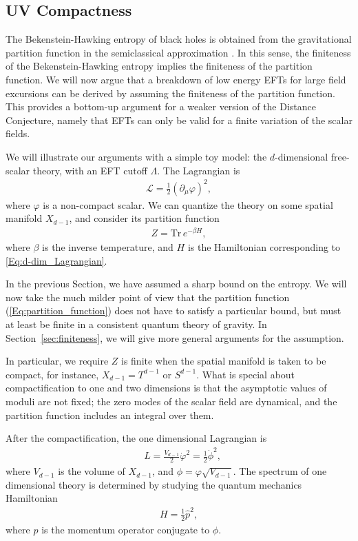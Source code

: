 \documentclass[11pt]{article}
\numberwithin{equation}{section}
\newcommand{\eq}[1]{(\ref{#1})}
\numberwithin{equation}{section}
\theoremstyle{remark}
\begin{document}
\subsection{UV Compactness\label{sec:compact}}

The Bekenstein-Hawking entropy of black holes is obtained from the gravitational partition function in the semiclassical approximation \cite{Gibbons:1976ue}. In this sense, the finiteness of the Bekenstein-Hawking entropy implies the finiteness of the partition function.
We will now argue that a breakdown of low energy EFTs for large field excursions can be derived by assuming the finiteness of the partition function.
This provides a bottom-up argument for a weaker version of the Distance Conjecture, namely that EFTs can only be valid for a finite variation of the scalar fields.

We will illustrate our arguments with a simple toy model: the $d$-dimensional free-scalar theory,  with an EFT cutoff $\Lambda$.
The Lagrangian is 
\begin{align}
\mathcal{L} = \frac{1}{2}\left(\partial_\mu\varphi\right)^2,
\label{Eq:d-dim_Lagrangian}\end{align}
where $\varphi$ is a non-compact scalar.
We can quantize the theory on some spatial manifold $X_{d-1}$, and consider its partition function
\begin{align}
Z=\mathrm{Tr} \,e^{-\beta H},
\label{Eq:partition_function}\end{align}
where $\beta$ is the inverse temperature, and $H$ is the Hamiltonian corresponding to \eqref{Eq:d-dim_Lagrangian}. 

In the previous Section, we have assumed a sharp bound on the entropy.  We will now take the much milder point of view that the partition function \eq{Eq:partition_function} does not have to satisfy a particular bound, but must at least be finite in a consistent quantum theory of gravity.  
In Section~\ref{sec:finiteness}, we will give more general arguments for the assumption.

In particular, we require $Z$ is finite when the spatial manifold is taken to be compact, for instance, $X_{d-1}=T^{d-1}$ or $S^{d-1}$.
What is special about compactification to one and two dimensions is that the asymptotic values of moduli are not fixed; the zero modes of the scalar field are dynamical, and the partition function includes an integral over them.

After the compactification, the one dimensional Lagrangian is
\begin{align}
&L = \frac{V_{d-1}}{2}\dot{\varphi}^2= \frac{1}{2}\dot{\phi}^2,
\end{align}
where $V_{d-1}$ is the volume of $X_{d-1}$, and $\phi=\varphi\sqrt{V_{d-1}}$.
The spectrum of one dimensional theory is determined by studying the quantum mechanics Hamiltonian
\begin{align}
H= \frac{1}{2}\hat{p}^2,
\label{Eq:Hamilatonian}\end{align}
where $\hat{p}$ is the momentum operator conjugate to $\phi$.
\end{document}
